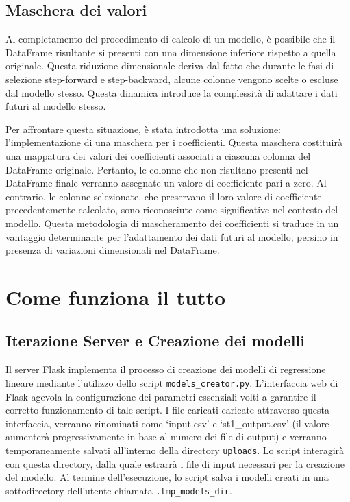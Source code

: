 \documentclass[a4paper,10pt]{article}
\begin{document}
\subsection{Maschera dei valori}

Al completamento del procedimento di calcolo di un modello, è possibile che il DataFrame risultante si presenti con una dimensione inferiore rispetto
a quella originale. Questa riduzione dimensionale deriva dal fatto che durante le fasi di selezione step-forward e step-backward, alcune colonne vengono 
scelte o escluse dal modello stesso. Questa dinamica introduce la complessità di adattare i dati futuri al modello stesso.

Per affrontare questa situazione, è stata introdotta una soluzione: l'implementazione di una maschera per i coefficienti. 
Questa maschera costituirà una mappatura dei valori dei coefficienti associati a ciascuna colonna del DataFrame originale. 
Pertanto, le colonne che non risultano presenti nel DataFrame finale verranno assegnate un valore di coefficiente pari a zero. Al contrario, le colonne 
selezionate, che preservano il loro valore di coefficiente precedentemente calcolato, sono riconosciute come significative nel contesto del modello. 
Questa metodologia di mascheramento dei coefficienti si traduce in un vantaggio determinante per l'adattamento dei dati futuri al modello, 
persino in presenza di variazioni dimensionali nel DataFrame.

\section{Come funziona il tutto}

\subsection{Iterazione Server e Creazione dei modelli}

Il server Flask implementa il processo di creazione dei modelli di regressione lineare mediante l'utilizzo dello script \texttt{models\_creator.py}. 
L'interfaccia web di Flask agevola la configurazione dei parametri essenziali volti a garantire il corretto funzionamento di tale script. 
I file caricati caricate attraverso questa interfaccia, verranno rinominati come `input.csv' e `st1\_output.csv' (il valore aumenterà progressivamente in base al numero dei file di output)
e verranno temporaneamente salvati all'interno della directory \texttt{uploads}.
Lo script interagirà con questa directory, dalla quale estrarrà i file di input necessari per la creazione del modello.
Al termine dell'esecuzione, lo script salva i modelli creati in una sottodirectory dell'utente chiamata \texttt{.tmp\_models\_dir}.
\end{document}
